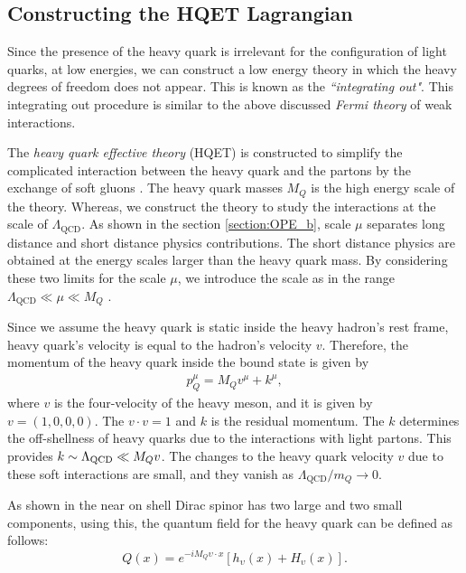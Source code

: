 \subsection{Constructing the HQET Lagrangian}\label{sec:HQET_Lag_constr}
Since the presence of the heavy quark is irrelevant for the configuration of light quarks, at low energies, we can construct a low energy theory in which the heavy degrees of freedom does not appear. This is known as the \textit{``integrating out"}.
This integrating out procedure is similar to the above discussed \textit{Fermi theory} of weak interactions. \par
The \textit{heavy quark effective theory} (HQET) is constructed to simplify the complicated interaction between the heavy quark and the partons by the exchange of soft gluons \cite{Eichten:1980mw, Isgur:1989vq, Balzereit:1996yy, Grinstein:1990mj}. The heavy quark masses $M_Q$ is the high energy scale of the theory. Whereas, we construct the theory to study the interactions at the scale of $\Lambda_{\text{QCD}}$.
 As shown in the section \ref{section:OPE_b}, scale $\mu$ separates long distance and short distance physics contributions. The short distance physics are obtained at the energy scales larger than the heavy quark mass. By considering these two limits for the scale $\mu$, we introduce the scale as in the range $\Lambda_{\text{QCD}}\ll\mu \ll M_Q$ \cite{Neubert:1997gu}. \par
Since we assume the heavy quark is static inside the heavy hadron's rest frame, heavy quark's velocity is equal to the hadron's velocity $v$. Therefore, the momentum of the heavy quark inside the bound state is given by
\begin{eqnarray}
p_{Q}^{\mu}=M_{Q} v^{\mu}+k^{\mu},
\end{eqnarray} 
where $v$ is the four-velocity of the heavy meson, and it is given by $v=(1,0,0,0)$. The $v\cdot v=1$ and $k$ is the residual momentum. The $k$ determines the off-shellness of heavy quarks due to the interactions with light partons. This provides $k\sim\Lambda_{\rm{QCD}}\ll M_Q v$. The changes to the heavy quark velocity $v$ due to these soft interactions are small, and they vanish as $\Lambda_{\mathrm{QCD}} / m_{Q} \rightarrow 0$. \par
As shown in \cite{Neubert:2005mu, Petrov:2016azi}  the near on shell Dirac spinor has two large and two small components, using this, the quantum field for the heavy quark can be defined as follows:
\begin{equation}\label{eqn:HQET_param}
Q(x)= e^{-iM_{Q}\upsilon \cdot x}[h_{\upsilon}(x)+H_{\upsilon}(x)].
\end{equation}
